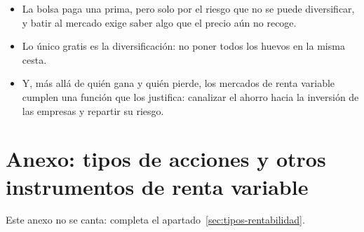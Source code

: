 \documentclass[11pt]{article}
\begin{document}
\begin{itemize}
\begin{itemize}
  \item La bolsa paga una prima, pero solo por el riesgo que no se puede diversificar, y batir al mercado exige saber algo que el precio aún no recoge.

  \item Lo único gratis es la diversificación: no poner todos los huevos en la misma cesta.

  \item Y, más allá de quién gana y quién pierde, los mercados de renta variable cumplen una función que los justifica: canalizar el ahorro hacia la inversión de las empresas y repartir su riesgo.
  \end{itemize}
\end{itemize}

\clearpage
\appendix

\section{Anexo: tipos de acciones\cortetitulo{} y otros instrumentos de renta variable}\label{anexo:acciones}

Este anexo no se canta: completa el apartado~\ref{sec:tipos-rentabilidad}.
\end{document}
